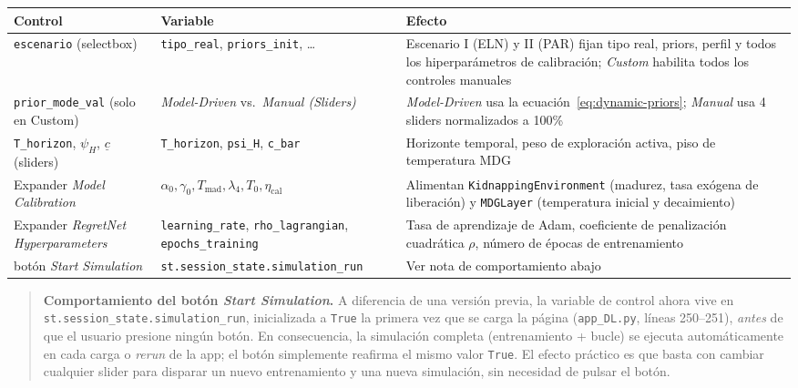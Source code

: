 \documentclass[ecta,nameyear,draft]{econsocart}
\newcommand{\pyfile}[1]{\texttt{#1}}
\newcommand{\pyvar}[1]{\texttt{#1}}
\begin{document}
\begin{center}
\footnotesize
\begin{tabular}{@{}p{3.2cm}p{3.5cm}p{6.0cm}@{}}
\toprule
\textbf{Control} & \textbf{Variable} & \textbf{Efecto} \\
\midrule
\pyvar{escenario} (selectbox) & \pyvar{tipo\_real}, \pyvar{priors\_init}, \ldots & Escenario I (ELN) y II (PAR) fijan tipo real, priors, perfil y todos los hiperparámetros de calibración; \emph{Custom} habilita todos los controles manuales \\
\pyvar{prior\_mode\_val} (solo en Custom) & \emph{Model-Driven} vs.\ \emph{Manual (Sliders)} & \emph{Model-Driven} usa la ecuación~\eqref{eq:dynamic-priors}; \emph{Manual} usa 4 sliders normalizados a 100\% \\
\pyvar{T\_horizon}, $\psi_H$, $\underline{c}$ (sliders) & \pyvar{T\_horizon}, \pyvar{psi\_H}, \pyvar{c\_bar} & Horizonte temporal, peso de exploración activa, piso de temperatura MDG \\
Expander \emph{Model Calibration} & $\alpha_0,\gamma_0, T_{\mathrm{mad}}, \lambda_4, T_0, \eta_{\mathrm{cal}}$ & Alimentan \pyvar{KidnappingEnvironment} (madurez, tasa exógena de liberación) y \pyvar{MDGLayer} (temperatura inicial y decaimiento) \\
Expander \emph{RegretNet Hyperparameters} & \pyvar{learning\_rate}, \pyvar{rho\_lagrangian}, \pyvar{epochs\_training} & Tasa de aprendizaje de Adam, coeficiente de penalización cuadrática $\rho$, número de épocas de entrenamiento \\
botón \emph{Start Simulation} & \pyvar{st.session\_state.}\linebreak\pyvar{simulation\_run} & Ver nota de comportamiento abajo \\
\bottomrule
\end{tabular}
\normalsize
\end{center}

\begin{quotation}
\noindent\textbf{Comportamiento del botón \emph{Start Simulation}.} A diferencia de una
versión previa, la variable de control ahora vive en
\pyvar{st.session\_state.simulation\_run}, inicializada a \pyvar{True} la primera vez que se
carga la página (\pyfile{app\_DL.py}, líneas 250--251), \emph{antes} de que el usuario
presione ningún botón. En consecuencia, la simulación completa (entrenamiento + bucle) se
ejecuta automáticamente en cada carga o \emph{rerun} de la app; el botón simplemente reafirma
el mismo valor \pyvar{True}. El efecto práctico es que basta con cambiar cualquier slider para
disparar un nuevo entrenamiento y una nueva simulación, sin necesidad de pulsar el botón.
\end{quotation}
\end{document}
